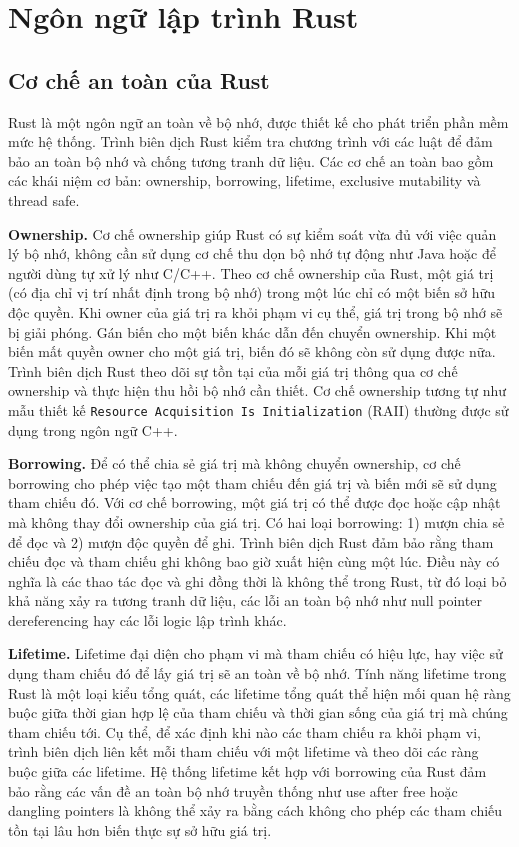 \section{Ngôn ngữ lập trình Rust}

\subsection{Cơ chế an toàn của Rust}

Rust là một ngôn ngữ an toàn về bộ nhớ, được thiết kế cho phát triển phần mềm mức hệ thống.
Trình biên dịch Rust kiểm tra chương trình với các luật để đảm bảo an toàn bộ nhớ và chống tương tranh dữ liệu.
Các cơ chế an toàn bao gồm các khái niệm cơ bản: ownership, borrowing, lifetime, exclusive mutability và thread safe.

\textbf{Ownership.} Cơ chế ownership giúp Rust có sự kiểm soát vừa đủ với việc quản lý bộ nhớ, không cần sử dụng cơ chế thu dọn bộ nhớ tự động như Java hoặc để người dùng tự xử lý như C/C++.
Theo cơ chế ownership của Rust, một giá trị (có địa chỉ vị trí nhất định trong bộ nhớ) trong một lúc chỉ có một biến sở hữu độc quyền.
Khi owner của giá trị ra khỏi phạm vi cụ thể, giá trị trong bộ nhớ sẽ bị giải phóng.
Gán biến cho một biến khác dẫn đến chuyển ownership.
Khi một biến mất quyền owner cho một giá trị, biến đó sẽ không còn sử dụng được nữa.
Trình biên dịch Rust theo dõi sự tồn tại của mỗi giá trị thông qua cơ chế ownership và thực hiện thu hồi bộ nhớ cần thiết.
Cơ chế ownership tương tự như mẫu thiết kế \texttt{Resource Acquisition Is Initialization} (RAII) \cite{cppreferenceRAIICppreferencecom} thường được sử dụng trong ngôn ngữ C++.

\textbf{Borrowing.} Để có thể chia sẻ giá trị mà không chuyển ownership, cơ chế borrowing cho phép việc tạo một tham chiếu đến giá trị và biến mới sẽ sử dụng tham chiếu đó.
Với cơ chế borrowing, một giá trị có thể được đọc hoặc cập nhật mà không thay đổi ownership của giá trị.
Có hai loại borrowing: 1) mượn chia sẻ để đọc và 2) mượn độc quyền để ghi.
Trình biên dịch Rust đảm bảo rằng tham chiếu đọc và tham chiếu ghi không bao giờ xuất hiện cùng một lúc.
Điều này có nghĩa là các thao tác đọc và ghi đồng thời là không thể trong Rust, từ đó loại bỏ khả năng xảy ra tương tranh dữ liệu, các lỗi an toàn bộ nhớ như null pointer dereferencing hay các lỗi logic lập trình khác.

\textbf{Lifetime.} Lifetime đại diện cho phạm vi mà tham chiếu có hiệu lực, hay việc sử dụng tham chiếu đó để lấy giá trị sẽ an toàn về bộ nhớ.
Tính năng lifetime trong Rust là một loại kiểu tổng quát, các lifetime tổng quát thể hiện mối quan hệ ràng buộc giữa thời gian hợp lệ của tham chiếu và thời gian sống của giá trị mà chúng tham chiếu tới.
Cụ thể, để xác định khi nào các tham chiếu ra khỏi phạm vi, trình biên dịch liên kết mỗi tham chiếu với một lifetime và theo dõi các ràng buộc giữa các lifetime.
Hệ thống lifetime kết hợp với borrowing của Rust đảm bảo rằng các vấn đề an toàn bộ nhớ truyền thống như use after free hoặc dangling pointers là không thể xảy ra bằng cách không cho phép các tham chiếu tồn tại lâu hơn biến thực sự sở hữu giá trị.

